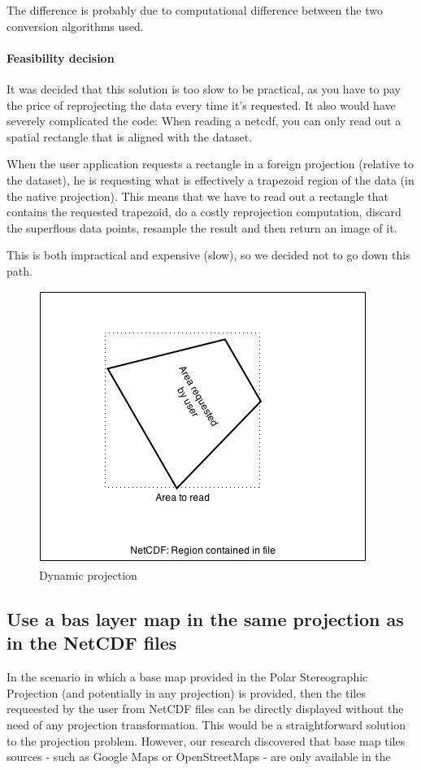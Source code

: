 \documentclass[11pt,a4paper,titlepage,oneside]{report}
\begin{document}
The difference is probably due to computational difference between the two conversion algorithms used.

\paragraph{Feasibility decision}
It was decided that this solution is too slow to be practical, as you have to pay the price of reprojecting the data every time it's requested. It also would have severely complicated the code: When reading a \gls{netcdf}, you can only read out a spatial rectangle that is aligned with the dataset.

When the user application requests a rectangle in a foreign projection (relative to the dataset), he is requesting what is effectively a trapezoid region of the data (in the native projection).
This means that we have to read out a rectangle that contains the requested trapezoid, do a costly reprojection computation, discard the superflous data points, resample the result and then return an image of it.

This is both impractical and expensive (slow), so we decided not to go down this path.

\begin{figure}[h]
\includegraphics{img/dynamic_projection.png}
  \caption{Dynamic projection}
    \label{fig:tileMatrixSet}
\end{figure}

\subsection{Use a bas layer map in the same projection as in the NetCDF files}
In the scenario in which a base map provided in the Polar Stereographic Projection (and potentially in any projection) is provided, then the tiles requeested by the user from NetCDF files can be directly displayed without the need of any projection transformation. This would be a straightforward solution to the projection problem.
However, our research discovered that base map tiles sources - such as Google Maps or OpenStreetMaps - are only available in the 
\end{document}
